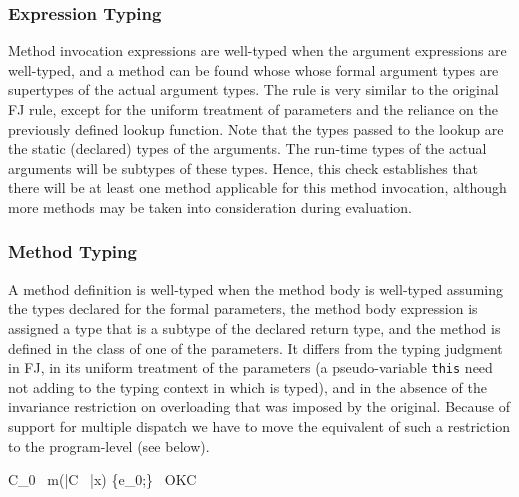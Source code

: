 \documentclass[11pt]{article}
\begin{document}
\medskip

\subsubsection*{Expression Typing}

Method invocation expressions are well-typed when the argument expressions are well-typed, and a method can be found whose whose formal argument types are supertypes of the actual argument types. The rule is very similar to the original FJ rule, except for the uniform treatment of parameters and the reliance on the previously defined lookup function. Note that the types passed to the lookup are the static (declared) types of the arguments. The run-time types of the actual arguments will be subtypes of these types. Hence, this check establishes that there will be at least one method applicable for this method invocation, although more methods may be taken into consideration during evaluation.

 {}


\medskip



\subsubsection{Method Typing}

A method definition is well-typed when  the method body is well-typed assuming the types declared for the formal parameters,  the method body expression is assigned a type that is a subtype of the declared return type, and  the method is defined in the class of one of the parameters. It differs from the typing judgment in FJ, in its uniform treatment of the parameters (a pseudo-variable \texttt{this} need not adding to the typing context in which  is typed), and in the absence of the invariance restriction on overloading that was imposed by the original. Because of support for multiple dispatch we have to move the equivalent of such a restriction to the program-level (see below).

 {C_0 \  m(\bar{C} \ \bar{x}) \{e_0;\} \ OKC}
\end{document}
